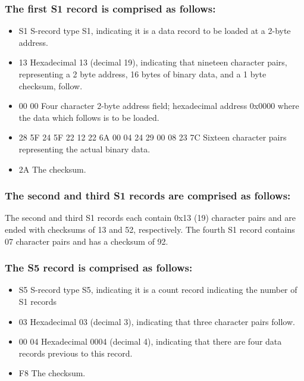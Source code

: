     \subsubsection{The first S1 record is comprised as follows:}
        \begin{itemize}
            \item S1 S-record type S1, indicating it is a data record to be loaded at a 2-byte address.
            \item 13 Hexadecimal 13 (decimal 19), indicating that nineteen character pairs, representing a 2 byte address, 16 bytes of binary data, and a 1 byte checksum, follow.
            \item 00 00 Four character 2-byte address field; hexadecimal address 0x0000 where the data which follows is to be loaded.
            \item 28 5F 24 5F 22 12 22 6A 00 04 24 29 00 08 23 7C Sixteen character pairs representing the actual binary data.
            \item 2A The checksum.
        \end{itemize}

    \subsubsection{The second and third S1 records are comprised as follows:}
        The second and third S1 records each contain 0x13 (19) character pairs and are ended with checksums of 13 and 52, respectively. The fourth S1 record contains 07 character pairs and has a checksum of 92.

    \subsubsection{The S5 record is comprised as follows:}
        \begin{itemize}
            \item S5 S-record type S5, indicating it is a count record indicating the number of S1 records
            \item 03 Hexadecimal 03 (decimal 3), indicating that three character pairs follow.
            \item 00 04 Hexadecimal 0004 (decimal 4), indicating that there are four data records previous to this record.
            \item F8 The checksum.
        \end{itemize}


